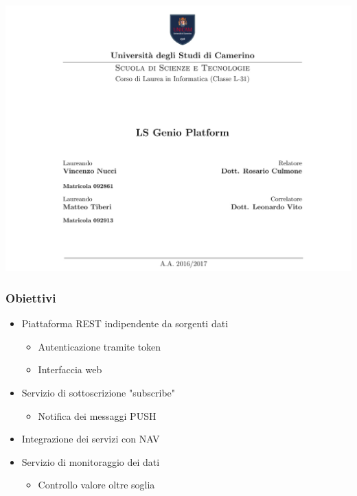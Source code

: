 \documentclass{beamer}
\date{}
\begin{document}
	
	\begin{frame}
	\centering
	\includegraphics[scale=0.25]{images/frontespizio-beamer.png}\par
\end{frame}

\begin{frame}
	\frametitle{Obiettivi}
		\begin{itemize}
			\item Piattaforma REST indipendente da sorgenti dati
			\begin{itemize}
				\item Autenticazione tramite token
				\item Interfaccia web
			\end{itemize}
			\item Servizio di sottoscrizione "subscribe"
			\begin{itemize}
				\item Notifica dei messaggi PUSH
			\end{itemize}
			\item Integrazione dei servizi con NAV
			\item Servizio di monitoraggio dei dati
			\begin{itemize}
				\item Controllo valore oltre soglia
			\end{itemize}
		\end{itemize}
\end{frame}
\end{document}
